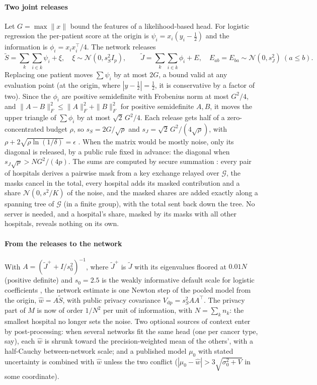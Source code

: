 \documentclass[acmsmall,screen,review]{acmart}
\theoremstyle{acmdefinition}
\begin{document}
\paragraph{Two joint releases} Let $G=\max\|x\|$ bound the features of a likelihood-based head. For logistic regression the per-patient score at the origin is $\psi_i=x_i(y_i-\tfrac12)$ and the information is $\phi_i=x_ix_i^{\top}/4$. The network releases
\[
\tilde{S}=\sum_{k}\sum_{i\in k}\psi_i+\xi,\quad \xi\sim\mathcal{N}(0,s_S^2I_p),\qquad
\tilde{J}=\sum_{k}\sum_{i\in k}\phi_i+E,\quad E_{ab}=E_{ba}\sim\mathcal{N}(0,s_J^2)\ (a\le b).
\]
Replacing one patient moves $\sum\psi_i$ by at most $2G$, a bound valid at any evaluation point (at the origin, where $|y-\frac12|=\frac12$, it is conservative by a factor of two). Since the $\phi_i$ are positive semidefinite with Frobenius norm at most $G^2/4$, and $\|A-B\|_F^2\le\|A\|_F^2+\|B\|_F^2$ for positive semidefinite $A,B$, it moves the upper triangle of $\sum\phi_i$ by at most $\sqrt2\,G^2/4$. Each release gets half of a zero-concentrated budget $\rho$, so $s_S=2G/\sqrt{\rho}$ and $s_J=\sqrt2\,G^2/(4\sqrt{\rho})$, with $\rho+2\sqrt{\rho\ln(1/\delta)}=\epsilon$ \cite{bun2016concentrated}. When the matrix would be mostly noise, only its diagonal is released, by a public rule fixed in advance: the diagonal when $s_J\sqrt{p}>NG^2/(4p)$. The sums are computed by secure summation \cite{bonawitz2017practical}: every pair of hospitals derives a pairwise mask from a key exchange relayed over $\mathcal{G}$, the masks cancel in the total, every hospital adds its masked contribution and a share $\mathcal{N}(0,s^2/K)$ of the noise, and the masked shares are added exactly along a spanning tree of $\mathcal{G}$ (in a finite group), with the total sent back down the tree. No server is needed, and a hospital's share, masked by its masks with all other hospitals, reveals nothing on its own.

\paragraph{From the releases to the network} With $A=(\tilde{J}^{+}+I/s_0^2)^{-1}$, where $\tilde{J}^{+}$ is $\tilde{J}$ with its eigenvalues floored at $0.01N$ (positive definite) and $s_0=2.5$ is the weakly informative default scale for logistic coefficients \cite{gelman2008weakly}, the network estimate is one Newton step of the pooled model from the origin, $\hat{w}=A\tilde{S}$, with public privacy covariance $V_{\mathrm{dp}}=s_S^2AA^{\top}$. The privacy part of $M$ is now of order $1/N^2$ per unit of information, with $N=\sum_kn_k$: the smallest hospital no longer sets the noise. Two optional sources of context enter by post-processing: when several networks fit the same head (one per cancer type, say), each $\hat{w}$ is shrunk toward the precision-weighted mean of the others', with a half-Cauchy between-network scale; and a published model $\mu_0$ with stated uncertainty is combined with $\hat{w}$ unless the two conflict ($|\mu_0-\hat{w}|>3\sqrt{\sigma_0^2+V}$ in some coordinate).
\end{document}
